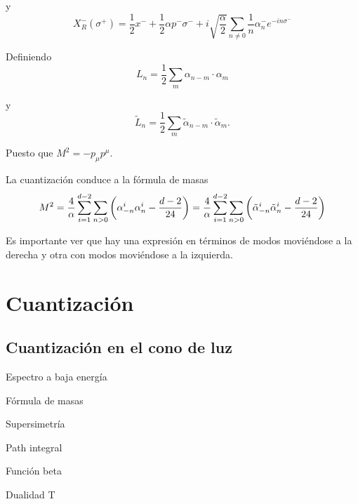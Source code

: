 y
\begin{equation}
  X^-_R(\sigma^+)=\frac 1 2 x^- + \frac 1 2 \alpha p^- \sigma^- + i\sqrt{\frac \alpha 2}
  \sum_{n\neq0} \frac 1 n \alpha^-_n e^{-in\sigma^-}
\end{equation}

Definiendo
\begin{equation}
  L_n=\frac 1 2 \sum_m \alpha_{n-m} \cdot \alpha_m
\end{equation}

y
\begin{equation}
  \tilde{L}_n=\frac 1 2 \sum_m \tilde{\alpha}_{n-m} \cdot \tilde{\alpha}_m.
\end{equation}

Puesto que $M^2=-p_\mu p^\mu$.

La cuantización conduce a la fórmula de masas 
\begin{equation}
  M^2=\frac{4}{\alpha}\sum_{i=1}^{d-2}\sum_{n>0}\qty(\alpha^i_{-n}\alpha^i_n - \frac{d-2}{24})=
  \frac{4}{\alpha}\sum_{i=1}^{d-2}\sum_{n>0}\qty(\tilde{\alpha}^i_{-n}\tilde{\alpha}^i_n -\frac{d-2}{24})
\end{equation}

Es importante ver que hay una expresión en términos de modos moviéndose a la derecha
y otra con modos moviéndose a la izquierda.

\section{Cuantización}

\subsection{Cuantización en el cono de luz}

Espectro a baja energía

Fórmula de masas

Supersimetría

Path integral 

Función beta

Dualidad T

